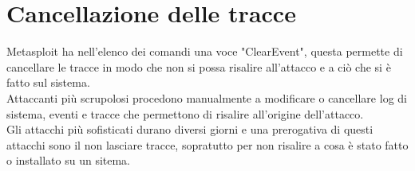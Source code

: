 \documentclass[a4paper,12pt]{article}
\begin{document}
\section{  Cancellazione delle tracce}

Metasploit\cite{metasploit} ha nell'elenco dei comandi una voce "ClearEvent", questa permette di cancellare le tracce in modo che non si possa risalire all'attacco e a ciò che si è fatto sul sistema.\\
Attaccanti più scrupolosi procedono manualmente  a modificare o cancellare log di sistema, eventi e tracce che permettono di risalire all'origine dell'attacco.\\
Gli attacchi più sofisticati durano diversi giorni e una prerogativa di questi attacchi sono il non lasciare tracce, sopratutto per non risalire a cosa è stato fatto o installato su un sitema.
\end{document}
